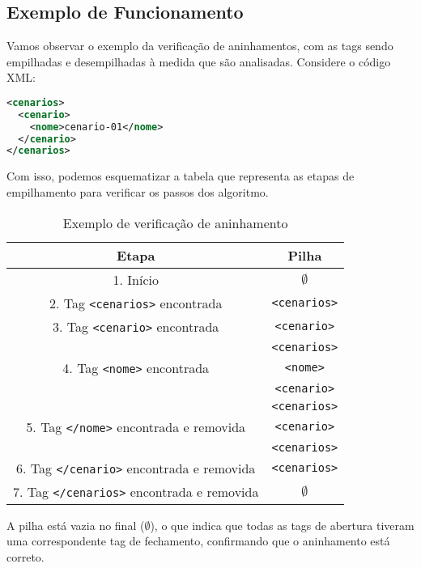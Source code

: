 \subsection{Exemplo de Funcionamento}
Vamos observar o exemplo da verificação de aninhamentos, com as tags sendo empilhadas e desempilhadas à medida que são analisadas. Considere o código XML:
\begin{lstlisting}[language=XML]
<cenarios>
  <cenario>
    <nome>cenario-01</nome>
  </cenario>
</cenarios>
\end{lstlisting}

Com isso, podemos esquematizar a tabela que representa as etapas de empilhamento para verificar os passos dos algoritmo.

\newpage

\begin{table}[h!]
\centering
\begin{tabular}{|c|c|}
\hline
\textbf{Etapa} & \textbf{Pilha} \\
\hline
1. Início & \(\emptyset\) \\
\hline
2. Tag \texttt{<cenarios>} encontrada & \texttt{<cenarios>} \\
\hline
3. Tag \texttt{<cenario>} encontrada & \texttt{<cenario>} \\
                                      & \texttt{<cenarios>} \\
\hline
4. Tag \texttt{<nome>} encontrada & \texttt{<nome>} \\
                                   & \texttt{<cenario>} \\
                                   & \texttt{<cenarios>} \\
\hline
5. Tag \texttt{</nome>} encontrada e removida & \texttt{<cenario>} \\
                                              & \texttt{<cenarios>} \\
\hline
6. Tag \texttt{</cenario>} encontrada e removida & \texttt{<cenarios>} \\
\hline
7. Tag \texttt{</cenarios>} encontrada e removida & \(\emptyset\) \\
\hline
\end{tabular}
\caption{Exemplo de verificação de aninhamento}
\end{table}

A pilha está vazia no final (\(\emptyset\)), o que indica que todas as tags de abertura tiveram uma correspondente tag de fechamento, confirmando que o aninhamento está correto.

